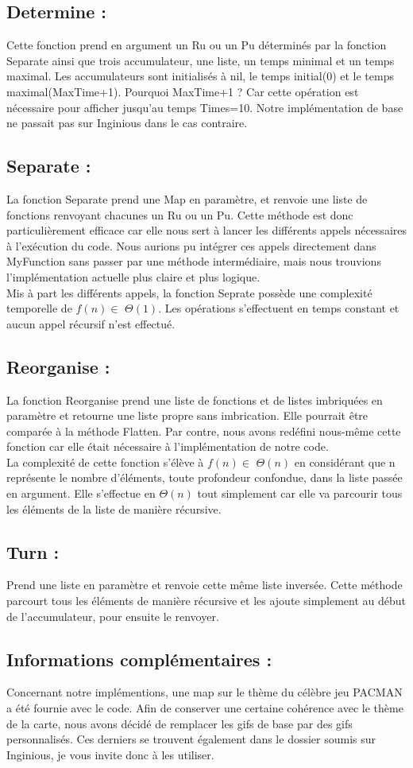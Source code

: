 \subsection{Determine :}
Cette fonction prend en argument un Ru ou un Pu déterminés par la fonction Separate ainsi que trois accumulateur, une liste, un temps minimal et un temps maximal. Les accumulateurs sont initialisés à nil, le temps initial(0) et le temps maximal(MaxTime+1). Pourquoi MaxTime+1 ? Car cette opération est nécessaire pour afficher jusqu'au temps Times=10. Notre implémentation de base ne passait pas sur Inginious dans le cas contraire.

\subsection{Separate :}
La fonction  Separate prend une Map en paramètre, et renvoie une liste de fonctions renvoyant chacunes un Ru ou un Pu. Cette méthode est donc particulièrement efficace car elle nous sert à lancer les différents appels nécessaires à l'exécution du code. Nous aurions pu intégrer ces appels directement dans MyFunction sans passer par une méthode intermédiaire, mais nous trouvions l'implémentation actuelle plus claire et plus logique.
\\Mis à part les différents appels, la fonction Seprate possède une complexité temporelle de $f(n) \in$ $\Theta(1)$. Les opérations s'effectuent en temps constant et aucun appel récursif n'est effectué.
\subsection{Reorganise :}
La fonction Reorganise prend une liste de fonctions et de listes imbriquées en paramètre et retourne une liste propre sans imbrication. Elle pourrait être comparée à la méthode Flatten. Par contre, nous avons redéfini nous-même cette fonction car elle était nécessaire à l'implémentation de notre code.
\\ La complexité de cette fonction s'élève à $f(n) \in$ $\Theta(n)$ en considérant que n représente le nombre d'éléments, toute profondeur confondue, dans la liste passée en argument. Elle s'effectue en $\Theta(n)$ tout simplement car elle va parcourir tous les éléments de la liste de manière récursive.
\subsection{Turn :}
Prend une liste en paramètre et renvoie cette même liste inversée. Cette méthode parcourt tous les éléments de manière récursive et les ajoute simplement au début de l'accumulateur, pour ensuite le renvoyer.
\subsection{Informations complémentaires :}
Concernant notre implémentions, une map sur le thème du célèbre jeu PACMAN a été fournie avec le code. Afin de conserver une certaine cohérence avec le thème de la carte, nous avons décidé de remplacer les gifs de base par des gifs personnalisés. Ces derniers se trouvent également dans le dossier soumis sur Inginious, je vous invite donc à les utiliser.